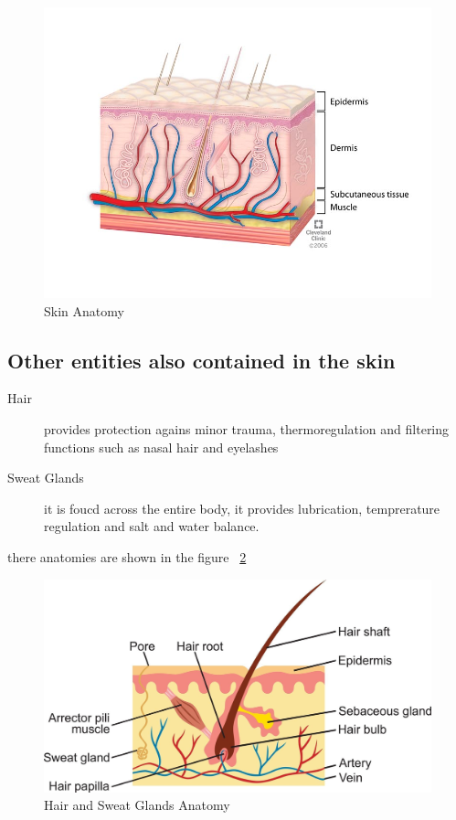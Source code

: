 \begin{figure}[htbp]
\begin{center}
\includegraphics[width=15cm]{./chapter-01-general-medical-information/skin-anatomy.jpg}
\end{center}
\caption{Skin Anatomy ~\cite{fig-skin}}
\label{fig:skin}
\end{figure}

\subsection{Other entities also contained in the skin}
\begin{description}
\item[Hair]  provides protection agains minor trauma, thermoregulation and filtering functions such as nasal hair and eyelashes
\item[Sweat Glands] it is foucd across the entire body, it provides lubrication, temprerature regulation and salt and water balance.
\end{description}
there anatomies are shown in the figure ~\ref{fig:hair}

\begin{figure}[htbp]
\begin{center}
\includegraphics[width=15cm]{./chapter-01-general-medical-information/hair-sweat-gland.jpg}
\end{center}
\caption{Hair and Sweat Glands Anatomy ~\cite{fig-hair}}
\label{fig:hair}
\end{figure}


